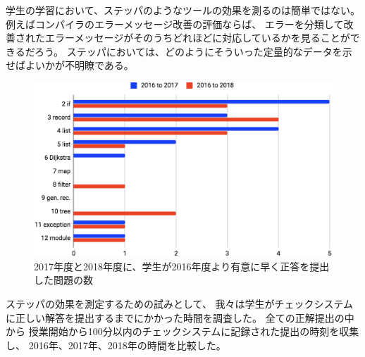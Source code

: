 学生の学習において、ステッパのようなツールの効果を測るのは簡単ではない。
例えばコンパイラのエラーメッセージ改善の評価ならば、
エラーを分類して改善されたエラーメッセージがそのうちどれほどに対応しているかを見ることができるだろう。
ステッパにおいては、どのようにそういった定量的なデータを示せばよいかが不明瞭である。

\begin{figure}
  \begin{center}
    \includegraphics[width=15cm]{6/table2.eps}
    \caption[学生が正答するまでの時間の比較]{
        2017年度と2018年度に、学生が2016年度より有意に早く正答を提出した問題の数
    }
    \label{figure:p}
  \end{center}
\end{figure}

ステッパの効果を測定するための試みとして、
我々は学生がチェックシステムに正しい解答を提出するまでにかかった時間を調査した。
全ての正解提出の中から
授業開始から100分以内のチェックシステムに記録された提出の時刻を収集し、
2016年、2017年、2018年の時間を比較した。

